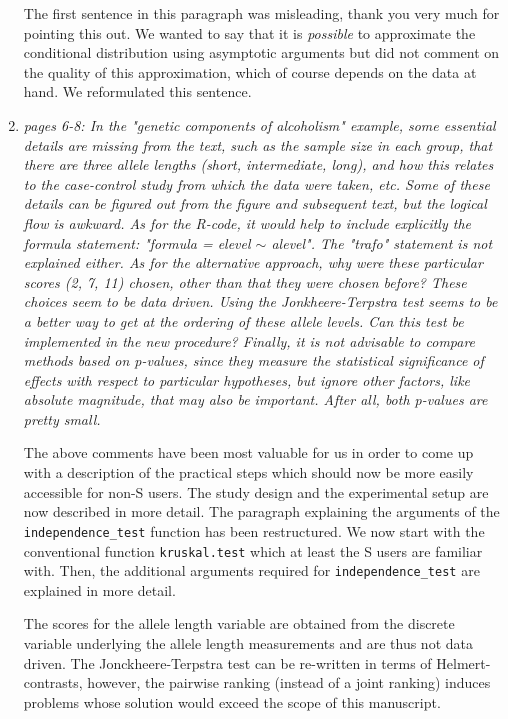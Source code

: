 \documentclass[11pt]{article}
\begin{document}
\begin{enumerate}
The first sentence in this paragraph was misleading, thank you very much for
pointing this out. We wanted to say that it is \textit{possible} to
approximate the conditional distribution using asymptotic arguments but did
not comment on the quality of this approximation, which of course depends on
the data at hand. We reformulated this sentence.

\item \textsl{pages 6-8:  In the "genetic components of alcoholism" example, some essential details are 
              missing from the text, such as the sample size in each group, that there are three allele 
              lengths (short, intermediate, long), and how this relates to the case-control study from 
              which the data were taken, etc. Some of these details can be figured out from the figure 
              and subsequent text, but the logical flow is awkward.  As for the R-code, it would help 
              to include explicitly the formula statement: "formula = elevel $\sim$ alevel". The "trafo" 
              statement is not explained either.  As for the alternative approach, why were these 
              particular scores (2, 7, 11) chosen, other than that they were chosen before? 
              These choices seem to be data driven. 
              Using the Jonkheere-Terpstra test seems to be a better way to get at the ordering of 
              these allele levels. Can this test be implemented in the new procedure? 
              Finally, it is not advisable to compare methods based on p-values, since they measure 
              the statistical significance of effects with respect to particular hypotheses, but 
              ignore other factors, like absolute magnitude, that may also be important. After all, 
              both p-values are pretty small.}

The above comments have been most valuable for us in order to come up with
a description of the practical steps which should now be more easily
accessible for non-\textsf{S}
users. The study design and the experimental setup are now described in more
detail. The paragraph explaining the arguments of the
\texttt{independence\_test} function has been restructured. We now start with the 
conventional function \texttt{kruskal.test} which at least the \textsf{S} users
are familiar with. Then, the additional arguments required for \texttt{independence\_test}
are explained in more detail.

The scores for the allele length variable are
obtained from the discrete variable underlying the allele length measurements
and are thus not data driven. The Jonckheere-Terpstra test 
can be re-written in
terms of Helmert-contrasts, however, the pairwise ranking (instead of a
joint ranking) induces problems whose solution would exceed the scope of
this manuscript.


\end{enumerate}
\end{document}
